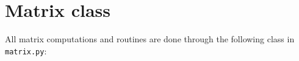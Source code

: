 \section{Matrix class}
All matrix computations and routines are done through the following class in \texttt{matrix.py}:

